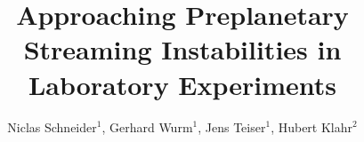 %
%
%
%
%
%
\RequirePackage{fix-cm}
%
\documentclass[twocolumn]{svjour3}          %
%
\smartqed  %
%
\usepackage{graphicx}
%
%
\usepackage{booktabs}

\usepackage{lineno}
\usepackage[round]{natbib}
%
%
%


\title{Approaching Preplanetary Streaming Instabilities in Laboratory Experiments}


\author{Niclas Schneider$^1$, Gerhard Wurm$^1$, Jens Teiser$^1$, Hubert Klahr$^2$}


